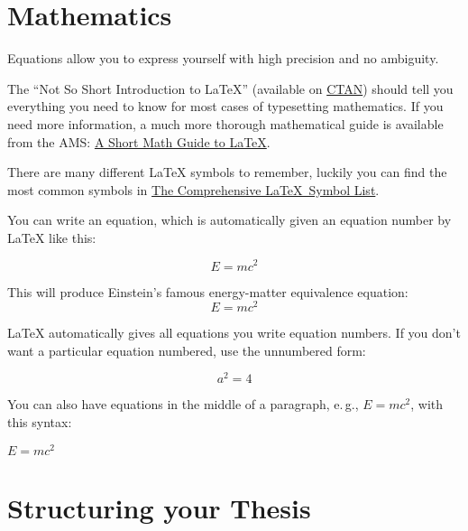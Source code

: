 \section{Mathematics}

Equations allow you to express yourself with high precision and no ambiguity. 

The \enquote{Not So Short Introduction to LaTeX} (available on \href{http://www.ctan.org/tex-archive/info/lshort/english/lshort.pdf}{CTAN}) should tell you everything you need to know for most cases of typesetting mathematics. If you need more information, a much more thorough mathematical guide is available from the AMS: \href{{ftp://ftp.ams.org/pub/tex/doc/amsmath/short-math-guide.pdf}}{A Short Math Guide to LaTeX}.

There are many different LaTeX symbols to remember, luckily you can find the most common symbols in \href{http://ctan.org/pkg/comprehensive}{The Comprehensive \LaTeX~Symbol List}.

You can write an equation, which is automatically given an equation number by LaTeX like this:
\begin{latex}
\begin{equation}
E = mc^{2}
\label{eqn:Einstein}
\end{equation}
\end{latex}

This will produce Einstein's famous energy-matter equivalence equation:
\begin{equation}
E = mc^{2}
\label{eqn:Einstein}
\end{equation}

LaTeX automatically gives all equations you write equation numbers. If you don't want a particular equation numbered, use the unnumbered form:
\begin{latex}
\[ a^{2}=4 \]
\end{latex}

You can also have equations in the middle of a paragraph, e.\,g., \( E = mc^{2} \), with this syntax: 

\begin{latex}
\( E = mc^{2} \)
\end{latex}


\section{Structuring your Thesis}

